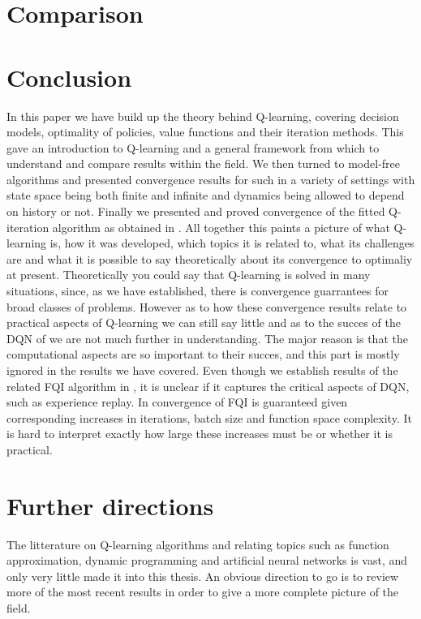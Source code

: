 
\section{Comparison}


\section{Conclusion}

In this paper we have build up the theory behind Q-learning,
covering decision models, optimality of policies,
value functions and their iteration methods.
This gave an introduction to Q-learning 
and a general framework from which to understand
and compare results within the field.
We then turned to model-free algorithms 
and presented convergence results for such in a variety
of settings with state space being both finite and infinite and
dynamics being allowed to depend on history or not.
Finally we presented and proved convergence of the fitted Q-iteration
algorithm as obtained in .
All together this paints a picture of what Q-learning is,
how it was developed, which topics it is related to,
what its challenges are and what it is possible to
say theoretically about its convergence to optimaliy at present.
Theoretically you could say that Q-learning is solved in many situations,
since, as we have established,
there is convergence guarrantees for broad classes of problems.
However as to how these convergence results relate to practical aspects of
Q-learning we can still say little and as to the succes of the DQN of
 we are not much further in understanding.
The major reason is that the computational aspects are so important to their 
succes, and this part is mostly ignored in the results we have covered.
Even though we establish results of the related FQI algorithm in ,
it is unclear if it captures the critical aspects of DQN,
such as experience replay.
In  convergence of FQI is guaranteed given corresponding
increases in iterations, batch size and function space complexity.
It is hard to interpret exactly how large these increases must be
or whether it is practical.

\section{Further directions}

The litterature on Q-learning algorithms and relating topics such as 
function approximation, dynamic programming and artificial neural networks
is vast, and only very little made it into this thesis. 
An obvious direction to go is to review more of the most recent results
in order to give a more complete picture of the field.

